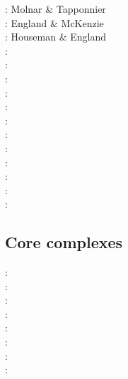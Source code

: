 \begin{scriptsize}
\nineteenseventyfive: Molnar \& Tapponnier \cite{mota75}\\
\nineteeneightytwo: England \& McKenzie \cite{enmc82} \\
\nineteeneightysix: Houseman \& England \cite{hoen86a}\\
\nineteenninetyeight: \cite{elbj98}\cite{bubr98}\\
\nineteenninetynine: \cite{elbe99}\cite{will99b}\\
\twothousand: \cite{sobm00}\\
\twothousandthree: \cite{refm03}\\
\twothousandfive: \cite{sobb05}\\
\twothousandnine: \cite{sckb09}\\
\twothousandeleven: \cite{lemk11}\\
\twothousandtwelve: \cite{mavf12}\\
\twothousandthirteen: \cite{scpo13}\\
\twothousandfourteen: \cite{lesh14}\\
\twothousandfifteen: \cite{puka15}\\
\twothousandeighteen: \cite{masg18}\cite{gesr18}
\end{scriptsize}

\subsection{Core complexes}

\begin{scriptsize}
\twothousandseven: \cite{gewm07}\\
\twothousandeight: \cite{tibb08}\\
\twothousandnine: \cite{tigv09}\\
\twothousandten: \cite{olbt10}\\
\twothousandtwelve: \cite{lehm12}\cite{scgb12}\\
\twothousandfifteen: \cite{pebu15}\\
\twothousandseventeen: \cite{esmp17}\\
\twothousandeighteen: \cite{brst18}
\end{scriptsize}

